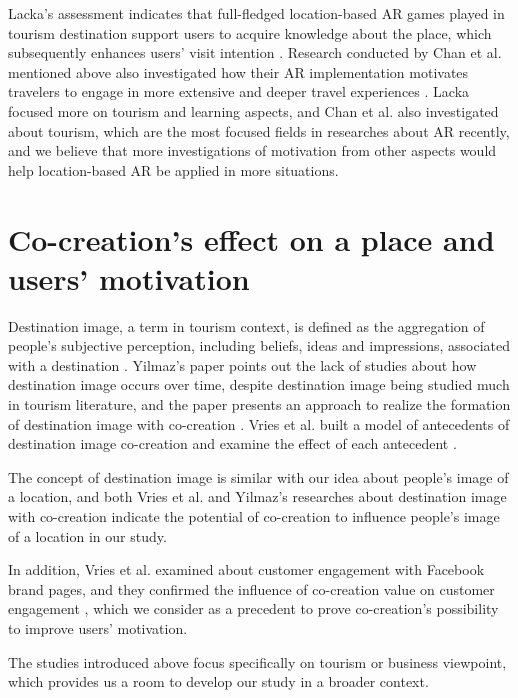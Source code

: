 Lacka's assessment indicates that full-fledged location-based AR games played in tourism destination support users to acquire knowledge about the place,
which subsequently enhances users' visit intention \cite{lacka_2018}.
Research conducted by Chan et al. mentioned above also investigated how their AR implementation motivates travelers to engage in more extensive and deeper travel experiences \cite{chan_lin_wang_lu_hsu_2017}.
Lacka focused more on tourism and learning aspects, and Chan et al. also investigated about tourism, which are the most focused fields in researches about AR recently,
and we believe that more investigations of motivation from other aspects would help location-based AR be applied in more situations.

\section{Co-creation's effect on a place and users' motivation}
Destination image, a term in tourism context, is defined as the aggregation of people's subjective perception,
including beliefs, ideas and impressions, associated with a destination \cite{kotler_haider_rein_2008}\cite{Lopes2011DestinationIO}.
Yilmaz's paper points out the lack of studies about how destination image occurs over time, despite destination image being studied much in tourism literature,
and the paper presents an approach to realize the formation of destination image with co-creation \cite{yilmaz_2021}.
Vries et al. built a model of antecedents of destination image co-creation and examine the effect of each antecedent \cite{glyptou_2021}.

The concept of destination image is similar with our idea about people's image of a location,
and both Vries et al. and Yilmaz's researches about destination image with co-creation indicate the potential of co-creation to influence people's image of a location in our study.

In addition, Vries et al. examined about customer engagement with Facebook brand pages, and they confirmed the influence of co-creation value on customer engagement \cite{vries_carlson_2014},
which we consider as a precedent to prove co-creation's possibility to improve users' motivation.

The studies introduced above focus specifically on tourism or business viewpoint, which provides us a room to develop our study in a broader context.

